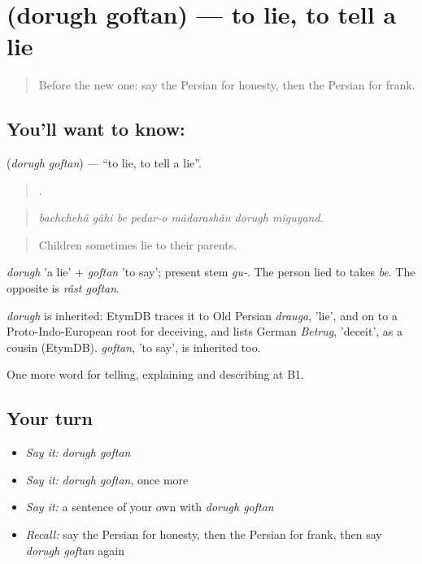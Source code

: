 \section[\texorpdfstring{\fa{دروغ} \fa{گفتن} (dorugh goftan)}{دروغ گفتن (dorugh goftan)}]{  (dorugh goftan) — to lie, to tell a lie}

\label{lesson:FA-C483-dorugh-goftan}



\begin{quote}
Before the new one: say the Persian for honesty, then the Persian for frank.
\end{quote}

\subsection*{You'll want to know:  }
\textbf{ } (\emph{dorugh goftan}) — \textquotedblleft{}to lie, to tell a lie\textquotedblright{}.

\begin{quote}
        .
\end{quote}

\begin{quote}
\emph{bachchehâ gâhi be pedar-o mâdarashân dorugh miguyand.}
\end{quote}

\begin{quote}
Children sometimes lie to their parents.
\end{quote}

\emph{dorugh} 'a lie' + \emph{goftan} 'to say'; present stem \emph{gu-}. The person lied to takes \emph{be}. The opposite is \emph{râst goftan}.

\begin{cousinweb}
\emph{dorugh} is inherited: EtymDB traces it to Old Persian \emph{drauga}, 'lie', and on to a Proto-Indo-European root for deceiving, and lists German \emph{Betrug}, 'deceit', as a cousin (EtymDB). \emph{goftan}, 'to say', is inherited too.
\end{cousinweb}

\begin{grammarlens}[title={What you've built}]
One more word for telling, explaining and describing at B1.
\end{grammarlens}

\subsection*{Your turn}
\begin{itemize}
\raggedright
  \item \emph{Say it:} \emph{dorugh goftan}
  \item \emph{Say it:} \emph{dorugh goftan}, once more
  \item \emph{Say it:} a sentence of your own with \emph{dorugh goftan}
  \item \emph{Recall:} say the Persian for honesty, then the Persian for frank, then say \emph{dorugh goftan} again
\end{itemize}

